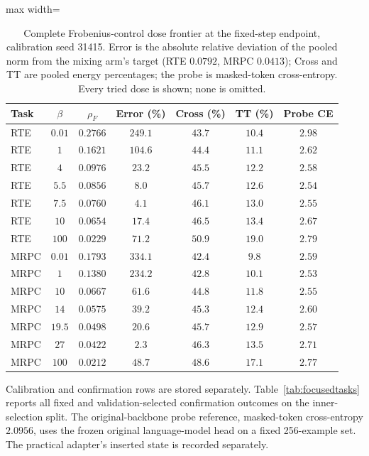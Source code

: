 \documentclass{article}
\begin{document}
\begin{table}[t]
\centering
\caption{Complete Frobenius-control dose frontier at the fixed-step endpoint, calibration seed 31415. Error is the absolute relative deviation of the pooled norm from the mixing arm's target (RTE $0.0792$, MRPC $0.0413$); Cross and TT are pooled energy percentages; the probe is masked-token cross-entropy. Every tried dose is shown; none is omitted.}
\label{tab:matchedfrontier}
\begin{adjustbox}{max width=\linewidth}
\begin{tabular}{lcccccc}
\toprule
Task & $\beta$ & $\rho_F$ & Error (\%) & Cross (\%) & TT (\%) & Probe CE \\
\midrule
RTE & $0.01$ & $0.2766$ & $249.1$ & $43.7$ & $10.4$ & $2.98$ \\
RTE & $1$ & $0.1621$ & $104.6$ & $44.4$ & $11.1$ & $2.62$ \\
RTE & $4$ & $0.0976$ & $23.2$ & $45.5$ & $12.2$ & $2.58$ \\
RTE & $5.5$ & $0.0856$ & $8.0$ & $45.7$ & $12.6$ & $2.54$ \\
RTE & $7.5$ & $0.0760$ & $4.1$ & $46.1$ & $13.0$ & $2.55$ \\
RTE & $10$ & $0.0654$ & $17.4$ & $46.5$ & $13.4$ & $2.67$ \\
RTE & $100$ & $0.0229$ & $71.2$ & $50.9$ & $19.0$ & $2.79$ \\
\midrule
MRPC & $0.01$ & $0.1793$ & $334.1$ & $42.4$ & $9.8$ & $2.59$ \\
MRPC & $1$ & $0.1380$ & $234.2$ & $42.8$ & $10.1$ & $2.53$ \\
MRPC & $10$ & $0.0667$ & $61.6$ & $44.8$ & $11.8$ & $2.55$ \\
MRPC & $14$ & $0.0575$ & $39.2$ & $45.3$ & $12.4$ & $2.60$ \\
MRPC & $19.5$ & $0.0498$ & $20.6$ & $45.7$ & $12.9$ & $2.57$ \\
MRPC & $27$ & $0.0422$ & $2.3$ & $46.3$ & $13.5$ & $2.71$ \\
MRPC & $100$ & $0.0212$ & $48.7$ & $48.6$ & $17.1$ & $2.77$ \\
\bottomrule
\end{tabular}
\end{adjustbox}
\end{table}

Calibration and confirmation rows are stored separately. Table~\ref{tab:focusedtasks} reports all fixed and validation-selected confirmation outcomes on the inner-selection split. The original-backbone probe reference, masked-token cross-entropy $2.0956$, uses the frozen original language-model head on a fixed 256-example set. The practical adapter's inserted state is recorded separately.
\end{document}
